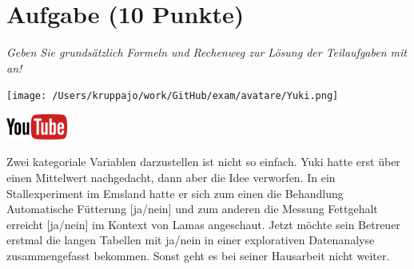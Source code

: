 \documentclass[a4paper, 9pt]{scrartcl}\usepackage[]{graphicx}\usepackage[]{xcolor}
\begin{document}
\section{Aufgabe \hfill (10 Punkte)}

\textit{Geben Sie grundsätzlich Formeln und Rechenweg zur Lösung der Teilaufgaben mit an!} \\[1Ex]
 

 
\begin{minipage}[t]{0.5\textwidth}
\texttt{[image: /Users/kruppajo/work/GitHub/exam/avatare/Yuki.png]}
\end{minipage}
\begin{minipage}[t]{0.5\textwidth}
\hfill
\href{https://youtu.be/t_1KL77mfmg}{\includegraphics[width = 2cm]{img/youtube}}\\[1Ex]
\end{minipage}
\vspace{1ex}



Zwei kategoriale Variablen darzustellen ist nicht so einfach. Yuki hatte erst über einen Mittelwert nachgedacht, dann aber die Idee verworfen. In ein Stallexperiment im Emsland hatte er sich zum einen die Behandlung Automatische Fütterung [ja/nein] und zum anderen die Messung Fettgehalt erreicht [ja/nein] im Kontext von Lamas angeschaut. Jetzt möchte sein Betreuer erstmal die langen Tabellen mit ja/nein in einer explorativen Datenanalyse zusammengefasst bekommen. Sonst geht es bei seiner Hausarbeit nicht weiter.



\vspace{1Ex}
\end{document}
